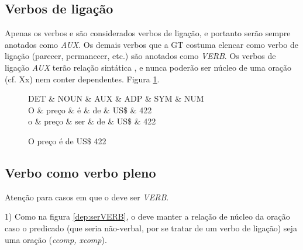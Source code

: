\documentclass[output=paper,colorlinks,citecolor=brown]{langscibook}
\begin{document}
\subsection{Verbos de ligação}\label{sec:verbosdeligação}

Apenas os verbos  e  são considerados verbos de ligação, e portanto serão sempre anotados como \textit{AUX}. Os demais verbos que a GT costuma elencar como verbo de ligação (parecer, permanecer, etc.) são anotados como \textit{VERB}. Os verbos de ligação \textit{AUX} terão relação sintática , e nunca poderão ser núcleo de uma oração (cf. Xx) nem conter dependentes. Figura \ref{dep:serAUX}.

\begin{figure}[htbp]
    \centering
    \vspace{.8cm}
    \begin{dependency}
    \begin{deptext}
    DET \& NOUN \& AUX \& ADP \& SYM \& NUM \\
    O \& preço \& é \& de \& US\$ \& 422 \\
    o \& preço \& ser \& de \& US\$ \& 422 \\
    \end{deptext}
    \end{dependency}
    \caption{O preço é de US\$ 422}\label{dep:serAUX}
\end{figure}

\subsection{Verbo  como verbo pleno}\label{sec:serpleno}

Atenção para casos em que o  deve ser \textit{VERB}.

1) Como na figura \ref{dep:serVERB}, o  deve manter a relação de núcleo da oração caso o predicado (que seria não-verbal, por se tratar de um verbo de ligação) seja uma oração (\textit{ccomp, xcomp}).
\end{document}
